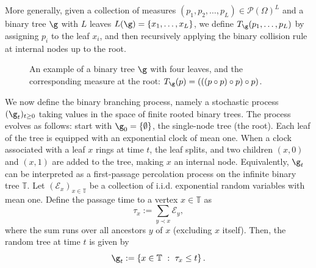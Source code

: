 \documentclass[11pt,reqno]{amsart}
\numberwithin{equation}{section}
\numberwithin{figure}{section}
\renewcommand{\leq}{\le}%
\renewcommand{\geq}{\ge} %
\newcommand{\1}{\mathds{1}}
\let\O=\Omega
\newcommand{\cE}{\ensuremath{\mathcal E}}
\newcommand{\cP}{\ensuremath{\mathcal P}}
\newcommand{\bbT}{{\ensuremath{\mathbb T}} }
\begin{document}
More generally, given a collection of measures \( (p_1, p_2, \dots, p_L) \in \cP(\O)^L \) and a binary tree \( \g \) with \( L \) leaves \( L(\g) = \{x_1, \dots, x_L\} \), we define \( T_\g(p_1, \dots, p_L) \) by assigning \( p_i \) to the leaf \( x_i \), and then recursively applying the binary collision rule at internal nodes up to the root.

\begin{figure}[h]
\centering
{}
\caption{An example of a binary tree \( \g \) with four leaves, and the corresponding measure at the root: \( T_\g(p) = (((p \circ p) \circ p) \circ p) \).}
\label{fig:fig2}
\end{figure}


We now define the binary branching process, namely a stochastic process \( (\g_t)_{t \geq 0} \) taking values in the space of finite rooted binary trees. The process evolves as follows: start with \( \g_0 = \{\emptyset\} \), the single-node tree (the root). Each leaf of the tree is equipped with an exponential clock of mean one. When a clock associated with a leaf \( x \) rings at time \( t \), the leaf splits, and two children \( (x,0) \) and \( (x,1) \) are added to the tree, making \( x \) an internal node.
Equivalently, \( \g_t \) can be interpreted as a first-passage percolation process on the infinite binary tree \( \bbT \). Let \( (\cE_x)_{x \in \bbT} \) be a collection of i.i.d. exponential random variables with mean one. Define the passage time to a vertex \( x \in \bbT \) as
\begin{equation} \label{eq:exl}
\tau_x := \sum_{y \prec x} \cE_y,
\end{equation}
where the sum runs over all ancestors \( y \) of \( x \) (excluding \( x \) itself). Then, the random tree at time \( t \) is given by
\begin{equation} \label{defct}
\g_t := \left\{ x \in \bbT \ : \ \tau_x \leq t \right\}.
\end{equation}
\end{document}
